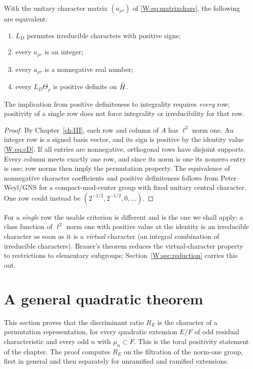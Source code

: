 \begin{proposition}\label{W:prop:positive}
With the unitary character matrix $(a_{\rho\tau})$ of
\eqref{W:eq:matrixchars}, the following are equivalent:
\begin{enumerate}[label=(\alph*)]
\item $L_D$ permutes irreducible characters with positive signs;
\item every $a_{\rho\tau}$ is an integer;
\item every $a_{\rho\tau}$ is a nonnegative real number;
\item every $L_D\Theta_\rho$ is positive definite on $\widetilde H$.
\end{enumerate}
The implication from positive definiteness to integrality
requires \emph{every} row; positivity of a single row does not
force integrality or irreducibility for that row.
\end{proposition}
\begin{proof}
By Chapter~\ref{ch:III}, each row and column of $A$ has $\ell^2$ norm one.
An integer row is a signed basis vector, and its sign is positive
by the identity value \eqref{W:eq:cD}.  If all entries are
nonnegative, orthogonal rows have disjoint supports.  Every
column meets exactly one row, and since its norm is one its
nonzero entry is one; row norms then imply the permutation
property.  The equivalence of nonnegative character coefficients
and positive definiteness follows from Peter--Weyl/GNS for a
compact-mod-center group with fixed unitary central character.
One row could instead be $(2^{-1/2},2^{-1/2},0,\ldots)$.
\end{proof}
\begin{remark}\label{W:rem:onerow}
For a \emph{single} row the usable criterion is different and is
the one we shall apply: a class function of $\ell^2$ norm one with
positive value at the identity is an irreducible character as soon
as it is a \emph{virtual} character (an integral combination of
irreducible characters).  Brauer's theorem reduces the virtual-character
property to restrictions to elementary subgroups; Section~\ref{W:sec:reduction}
carries this out.
\end{remark}

\section{A general quadratic theorem}\label{W:sec:general-toral}
This section proves that the discriminant ratio $R_E$ is the character of a permutation representation, for every quadratic extension $E/F$ of odd residual characteristic and every odd $n$ with $\mu_n\subset F$. This is the toral positivity statement of the chapter. The proof computes $R_E$ on the filtration of the norm-one group, first in general and then separately for unramified and ramified extensions.

